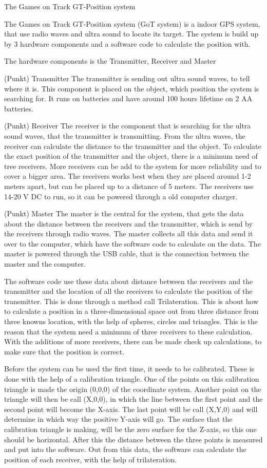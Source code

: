 The Games on Track GT-Position system

The Games on Track GT-Position system (GoT system) is a indoor GPS system, that use radio waves and ultra sound to locate its target. The system is build up by 3 hardware components and a software code to calculate the position with.

The hardware components is the Transmitter, Receiver and Master

(Punkt) Transmitter
The transmitter is sending out ultra sound waves, to tell where it is. This component is placed on the object, which position the system is searching for. It runs on batteries and have around 100 hours lifetime on 2 AA batteries.

(Punkt) Receiver
The receiver is the component that is searching for the ultra sound waves, that the transmitter is transmitting. From the ultra waves, the receiver can calculate the distance to the transmitter and the object. To calculate the exact position of the transmitter and the object, there is a minimum need of tree receivers. More receivers can be add to the system for more reliability and to cover a bigger area. The receivers works best when they are placed around 1-2 meters apart, but can be placed up to a distance of 5 meters. The receivers use 14-20 V DC to run, so it can be powered through a old computer charger.

(Punkt) Master
The master is the central for the system, that gets the data about the distance between the receivers and the transmitter, which is send by the receivers through radio waves. The master collects all this data and send it over to the computer, which have the software code to calculate on the data. The master is powered through the USB cable, that is the connection between the master and the computer.

The software code use these data about distance between the receivers and the transmitter and the location of all the receivers to calculate the position of the transmitter. This is done through a method call Trilateration. This is about how to calculate a position in a three-dimensional space out from three distance from three knowns location, with the help of spheres, circles and triangles. This is the reason that the system need a minimum of three receivers to these calculation. With the additions of more receivers, there can be made check up calculations, to make sure that the position is correct.

Before the system can be used the first time, it needs to be calibrated. These is done with the help of a calibration triangle. One of the points on this calibration triangle is made the origin (0,0,0) of the coordinate system. Another point on the triangle will then be call (X,0,0), in which the line between the first point and the second point will become the X-axis. The last point will be call (X,Y,0) and will determine in which way the positive Y-axis will go. The surface that the calibration triangle is making, will be the zero surface for the Z-axis, so this one should be horizontal. After this the distance between the three points is measured and put into the software. Out from this data, the software can calculate the position of each receiver, with the help of trilateration. 